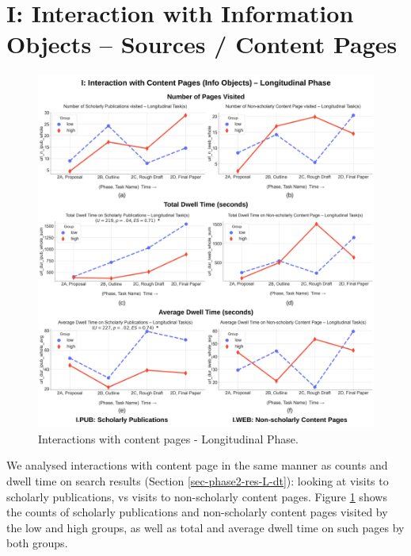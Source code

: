 \documentclass[letterpaper, nobind]{templates/ociamthesis}
\begin{document}
\hypertarget{i-interaction-with-information-objects-sources-content-pages}{%
\section{I: Interaction with Information Objects -- Sources / Content Pages}\label{i-interaction-with-information-objects-sources-content-pages}}

\begin{figure}

{\centering \includegraphics[width=1\linewidth]{figs/rp2-i} 

}

\caption[Interactions with content pages - Longitudinal Phase.]{Interactions with content pages - Longitudinal Phase.}\label{fig:rp2-i}
\end{figure}





We analysed interactions with content page in the same manner as counts and dwell time on search results (Section \ref{sec-phase2-res-L-dt}): looking at visits to scholarly publications, vs visits to non-scholarly content pages.
Figure \ref{fig:rp2-i} shows the counts of scholarly publications and non-scholarly content pages visited by the low and high groups, as well as total and average dwell time on such pages by both groups.
\end{document}

